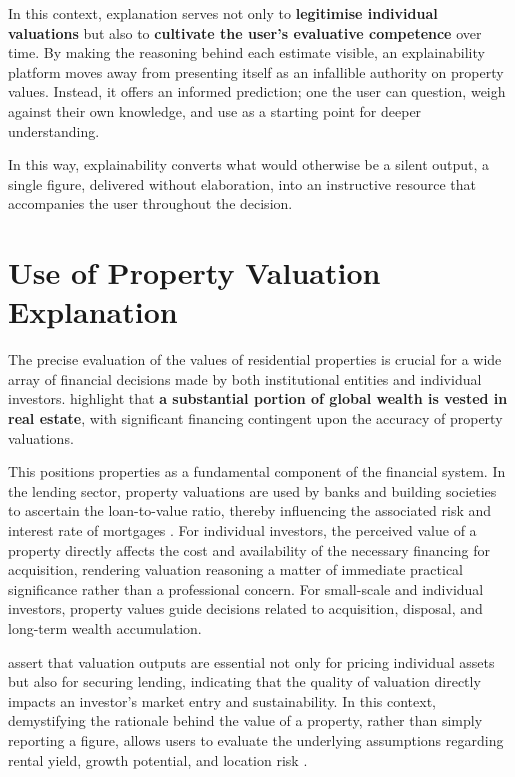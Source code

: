 In this context, explanation serves not only to \textbf{legitimise individual valuations} but also to \textbf{cultivate the user's evaluative competence} over time. By making the reasoning behind each estimate visible, an explainability platform moves away from presenting itself as an infallible authority on property values. Instead, it offers an informed prediction; one the user can question, weigh against their own knowledge, and use as a starting point for deeper understanding.

In this way, explainability converts what would otherwise be a silent output, a single figure, delivered without elaboration, into an instructive resource that accompanies the user throughout the decision.


\section{Use of Property Valuation Explanation}

The precise evaluation of the values of residential properties is crucial for a wide array of financial decisions made by both institutional entities and individual investors. \textcite{Gray2021}  highlight that \textbf{a substantial portion of global wealth is vested in real estate}, with significant financing contingent upon the accuracy of property valuations.

This positions properties as a fundamental component of the financial system.
In the lending sector, property valuations are used by banks and building societies to ascertain the loan-to-value ratio, thereby influencing the associated risk and interest rate of mortgages \parencite{Gan2008}. For individual investors, the perceived value of a property directly affects the cost and availability of the necessary financing for acquisition, rendering valuation reasoning a matter of immediate practical significance rather than a professional concern.
For small-scale and individual investors, property values guide decisions related to acquisition, disposal, and long-term wealth accumulation. 

\textcite{Johnson2024} assert that valuation outputs are essential not only for pricing individual assets but also for securing lending, indicating that the quality of valuation directly impacts an investor's market entry and sustainability. In this context, demystifying the rationale behind the value of a property, rather than simply reporting a figure, allows users to evaluate the underlying assumptions regarding rental yield, growth potential, and location risk \parencite{Gabrielli2021}. 

